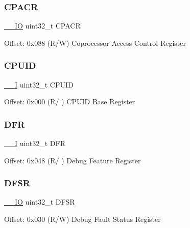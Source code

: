 \subsubsection{\texorpdfstring{CPACR}{CPACR}}
{\footnotesize\ttfamily \mbox{\hyperlink{core__sc300_8h_aec43007d9998a0a0e01faede4133d6be}{\+\_\+\+\_\+\+IO}} uint32\+\_\+t C\+P\+A\+CR}

Offset\+: 0x088 (R/W) Coprocessor Access Control Register \mbox{\label{struct_s_c_b___type_a30abfea43143a424074f682bd61eace0}} 
\subsubsection{\texorpdfstring{CPUID}{CPUID}}
{\footnotesize\ttfamily \mbox{\hyperlink{core__sc300_8h_af63697ed9952cc71e1225efe205f6cd3}{\+\_\+\+\_\+I}} uint32\+\_\+t C\+P\+U\+ID}

Offset\+: 0x000 (R/ ) C\+P\+U\+ID Base Register \mbox{\label{struct_s_c_b___type_a1b9a71780ae327f1f337a2176b777618}} 
\subsubsection{\texorpdfstring{DFR}{DFR}}
{\footnotesize\ttfamily \mbox{\hyperlink{core__sc300_8h_af63697ed9952cc71e1225efe205f6cd3}{\+\_\+\+\_\+I}} uint32\+\_\+t D\+FR}

Offset\+: 0x048 (R/ ) Debug Feature Register \mbox{\label{struct_s_c_b___type_a415598d9009bb3ffe9f35e03e5a386fe}} 
\subsubsection{\texorpdfstring{DFSR}{DFSR}}
{\footnotesize\ttfamily \mbox{\hyperlink{core__sc300_8h_aec43007d9998a0a0e01faede4133d6be}{\+\_\+\+\_\+\+IO}} uint32\+\_\+t D\+F\+SR}

Offset\+: 0x030 (R/W) Debug Fault Status Register \mbox{\label{struct_s_c_b___type_a87aadbc5e1ffb76d755cf13f4721ae71}} 
